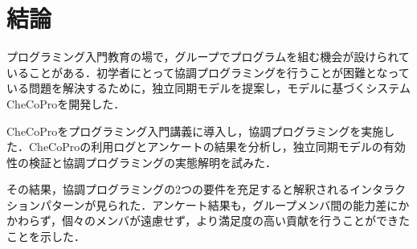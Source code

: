 \chapter{結論}\label{CC}

プログラミング入門教育の場で，グループでプログラムを組む機会が設けられていることがある．初学者にとって協調プログラミングを行うことが困難となっている問題を解決するために，独立同期モデルを提案し，モデルに基づくシステムCheCoProを開発した．

CheCoProをプログラミング入門講義に導入し，協調プログラミングを実施した．CheCoProの利用ログとアンケートの結果を分析し，独立同期モデルの有効性の検証と協調プログラミングの実態解明を試みた．

その結果，協調プログラミングの2つの要件を充足すると解釈されるインタラクションパターンが見られた．アンケート結果も，グループメンバ間の能力差にかかわらず，個々のメンバが遠慮せず，より満足度の高い貢献を行うことができたことを示した．